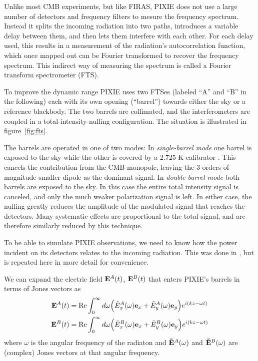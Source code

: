 \documentclass{article}
\renewcommand{\Re}{\operatorname{Re}}
\newcommand{\J}{{\tilde E}}
\renewcommand{\vec}[1]{{\bf #1}}
\begin{document}
Unlike most CMB experiments, but like FIRAS, PIXIE does not use a
large number of detectors and frequency filters to mesure the
frequency spectrum. Instead it splits the incoming radiation into
two paths, introduces a variable delay between them, and then lets them
interfere with each other. For each delay used, this results in
a measurement of the radiation's autocorrelation function, which
once mapped out can be Fourier transformed to recover the frequency
spectrum. This indirect way of measuring the spectrum is called
a Fourier transform spectrometer (FTS).

To improve the dynamic
range PIXIE uses two FTSes (labeled ``A'' and ``B'' in the following)
each with its own opening (``barrel'') towards either the sky or a
reference blackbody. The two barrels are collimated, and the
interferometers are coupled in a total-intensity-nulling configuration.
The situation is illustrated in figure~\ref{fig:fts}.

The barrels are operated in one of two modes:
In \emph{single-barrel mode} one barrel is
exposed to the sky while the other is covered by a 2.725 K calibrator
\citep{pixie2011}.
This cancels the contribution from the CMB monopole, leaving the
3 orders of magnitude smaller dipole as the dominant signal.
In \emph{double-barrel mode} both barrels are exposed to the sky.
In this case the entire total intensity signal is canceled, and
only the much weaker polarization signal is left.
In either case, the nulling greatly reduces the amplitude of the
modulated signal that reaches the detectors. Many systematic effects
are proportional to the total signal, and are therefore similarly
reduced by this technique.

To be able to simulate PIXIE observations, we need to know how
the power incident on its detectors relates to the incoming radiation.
This was done in \cite{pixie2011}, but is repeated here in more detail
for convenience.

We can expand the electric field $\vec E^A(t)$,
$\vec E^B(t)$ that enters PIXIE's barrels in terms of Jones vectors as
\begin{align}
	\vec E^A(t) &= \Re \int_0^\infty d\omega \Big(\J^A_x(\omega)\vec e_x +
		\J^A_y(\omega)\vec e_y\Big) e^{i(kz-\omega t)} \notag \\
	\vec E^B(t) &= \Re \int_0^\infty d\omega \Big(\J^B_x(\omega)\vec e_x +
		\J^B_y(\omega)\vec e_y\Big) e^{i(kz-\omega t)}
\end{align}
where $\omega$ is the angular frequency of the radiaton and $\vec \J^A(\omega)$
and $\vec \J^B(\omega)$ are (complex) Jones vectors at that
angular frequency.
\end{document}
